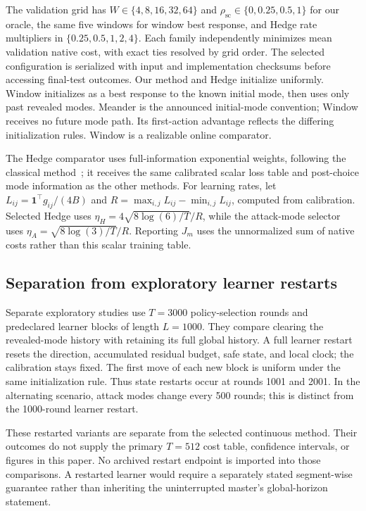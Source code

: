 The validation grid has $W\in\{4,8,16,32,64\}$ and
$\rho_{\mathrm{sc}}\in\{0,0.25,0.5,1\}$ for our oracle, the same five windows for window
best response, and Hedge rate multipliers in $\{0.25,0.5,1,2,4\}$.
Each family independently minimizes mean validation native cost, with exact
ties resolved by grid order. The selected configuration is serialized with
input and implementation checksums before accessing final-test outcomes.
Our method and Hedge initialize uniformly. Window initializes as a best
response to the known initial mode, then uses only past revealed modes.
Meander is the announced initial-mode convention; Window receives no future
mode path. Its first-action advantage reflects the differing initialization
rules. Window is a realizable online comparator.

The Hedge comparator uses full-information exponential weights, following
the classical method~\cite{freund1997hedge}; it receives the same calibrated
scalar loss table and post-choice mode information as the other methods.
For learning rates, let $L_{ij}=\mathbf 1^\top g_{ij}/(4B)$ and
$R=\max_{i,j}L_{ij}-\min_{i,j}L_{ij}$, computed from calibration.
Selected Hedge uses $\eta_H=4\sqrt{8\log(6)/T}/R$, while the attack-mode
selector uses $\eta_A=\sqrt{8\log(3)/T}/R$. Reporting $J_m$ uses the
unnormalized sum of native costs rather than this scalar training table.

\subsection{Separation from exploratory learner restarts}
Separate exploratory studies use $T=3000$ policy-selection rounds and
predeclared learner blocks of length $L=1000$. They compare clearing the
revealed-mode history with retaining its full global history. A full learner
restart resets the direction, accumulated residual budget, safe state, and
local clock; the calibration stays fixed. The first move of each new block
is uniform under the same initialization rule. Thus state restarts occur
at rounds 1001 and 2001. In the alternating scenario, attack modes change
every 500 rounds; this is distinct from the 1000-round learner restart.

These restarted variants are separate from the selected continuous method.
Their outcomes do not supply the primary $T=512$ cost table, confidence
intervals, or figures in this paper. No archived restart endpoint is imported
into those comparisons. A restarted learner would require a separately
stated segment-wise guarantee rather than inheriting the uninterrupted
master's global-horizon statement.


